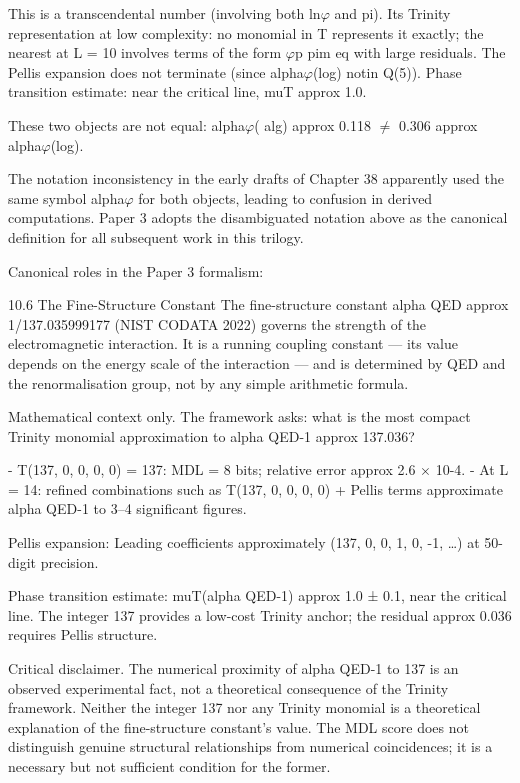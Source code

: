  This is a transcendental number (involving both ln$\varphi$ and pi). Its Trinity representation
  at low complexity: no monomial in T represents it exactly; the nearest at L = 10
  involves terms of the form $\varphi$p pim eq with large residuals. The Pellis expansion does not
  terminate (since alpha$\varphi$(log) notin Q(5)). Phase transition estimate: near the critical
  line, muT approx 1.0.

  These two objects are not equal: alpha$\varphi$( alg) approx 0.118 $\neq$ 0.306 approx alpha$\varphi$(log).

  The notation inconsistency in the early drafts of Chapter 38 apparently used the same
  symbol alpha$\varphi$ for both objects, leading to confusion in derived computations. Paper 3
  adopts the disambiguated notation above as the canonical definition for all subsequent
  work in this trilogy.

  Canonical roles in the Paper 3 formalism:

  10.6 The Fine-Structure Constant
  The fine-structure constant alpha QED approx 1/137.035999177 (NIST CODATA 2022)
  governs the strength of the electromagnetic interaction. It is a running coupling
  constant --- its value depends on the energy scale of the interaction --- and is
  determined by QED and the renormalisation group, not by any simple arithmetic
  formula.

  Mathematical context only. The framework asks: what is the most compact Trinity
  monomial approximation to alpha QED-1 approx 137.036?

  - T(137, 0, 0, 0, 0) = 137: MDL = 8 bits; relative error approx 2.6 $\times$ 10-4.
  - At L = 14: refined combinations such as T(137, 0, 0, 0, 0) + Pellis terms approximate
  alpha QED-1 to 3--4 significant figures.

  Pellis expansion: Leading coefficients approximately (137, 0, 0, 1, 0, -1, …) at 50-digit
  precision.

  Phase transition estimate: muT(alpha QED-1) approx 1.0 ± 0.1, near the critical line.
  The integer 137 provides a low-cost Trinity anchor; the residual approx 0.036 requires
  Pellis structure.

  Critical disclaimer. The numerical proximity of alpha QED-1 to 137 is an observed
  experimental fact, not a theoretical consequence of the Trinity framework. Neither the
  integer 137 nor any Trinity monomial is a theoretical explanation of the fine-structure
  constant's value. The MDL score does not distinguish genuine structural relationships
  from numerical coincidences; it is a necessary but not sufficient condition for the
  former.

